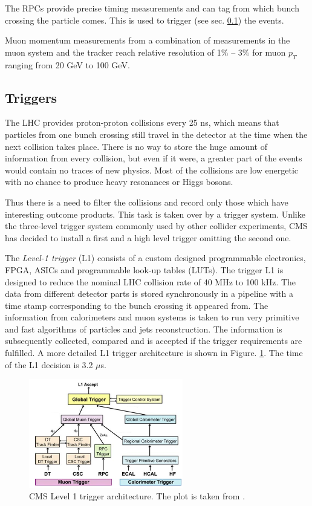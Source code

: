 The RPCs provide precise timing measurements and can tag from which bunch crossing the particle comes. This is used to trigger (see sec. \ref{sec:trig})
the events.

Muon momentum measurements from a combination of measurements in the muon system and the tracker reach relative resolution of 1$\%$ -- 3$\%$ for muon $p_{T}$
ranging from 20 GeV to 100 GeV.

\subsection{Triggers}\label{sec:trig}

The LHC provides proton-proton collisions every 25 ns, which means that particles from one bunch crossing still travel in the detector at 
the time when the next collision takes place. There is no way to store the huge amount of information from every collision, but even if it were,
a greater part of the events would contain no traces of new physics. Most of the collisions are low energetic with no chance
to produce heavy resonances or Higgs bosons.

Thus there is a need to filter the collisions and record only those which have interesting outcome products. This task is taken over by a trigger
system\cite{CMSatLHC}. Unlike the three-level trigger system commonly used by other collider experiments, CMS has decided to install a first and a high
level trigger omitting the second one.

The \textit{Level-1 trigger} (L1) consists of a custom designed programmable electronics, FPGA, ASICs and programmable look-up tables (LUTs).
The trigger L1 is designed to reduce the nominal LHC collision rate of 40 MHz to 100 kHz. The data from different detector parts is stored
synchronously in a pipeline with a time stamp corresponding to the bunch crossing it appeared from. The information from calorimeters and muon systems is taken to run very primitive
and fast algorithms of particles and jets reconstruction. The information is subsequently collected, compared and is accepted if the trigger
requirements are fulfilled. A more detailed L1 trigger architecture is shown in Figure. \ref{fig:trigA}. The time of the L1 decision is 3.2 $\mu$s. 

\begin{figure}[t]
  \centering
  \includegraphics[width=0.6\textwidth]{02_experimental_setup/plots/img_l1.png}
  \caption{CMS Level 1 trigger architecture. The plot is taken from \cite{CMSatLHC}.}
  \label{fig:trigA}
\end{figure}

